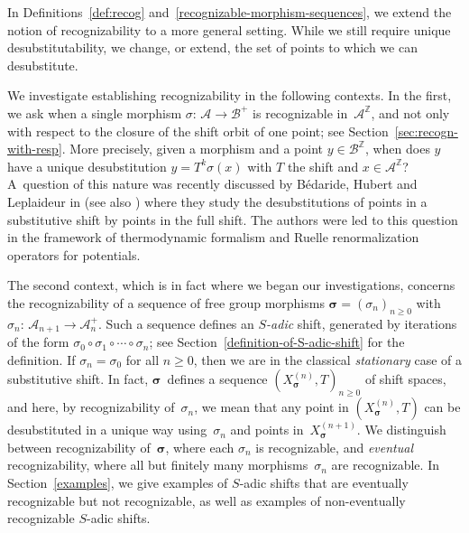 \documentclass{amsart}
\theoremstyle{definition}
\theoremstyle{remark}
\numberwithin{equation}{section}
\begin{document}
In Definitions~\ref{def:recog} and~\ref{recognizable-morphism-sequences},  we extend the notion of recognizability to a more general setting. While we still require unique desubstitutability, we change, or extend, the set of points to which we can desubstitute.
 
We investigate establishing recognizability in the following contexts.
In the first, we ask when a single morphism $\sigma:\, \mathcal{A} \to \mathcal{B}^+$ is recognizable in~$\mathcal{A}^\mathbb{Z}$, and not only with respect to the closure of the shift orbit of one point; see Section~\ref{sec:recogn-with-resp}. 
More precisely, given a morphism and a point $y\in\mathcal{B}^\mathbb{Z}$, when does $y$ have a unique desubstitution $y = T^k \sigma(x)$ with $T$ the shift and $x \in \mathcal{A}^\mathbb{Z}$? 
A~question of this nature was recently discussed by B\'{e}daride, Hubert and Leplaideur in \cite{BedHubLep:15} (see also \cite{Emme:16})  where they study the desubstitutions of  points in a  substitutive shift by points in the full shift.
The authors were led to this question in the framework of thermodynamic formalism and Ruelle renormalization operators for potentials.

The second context, which is in fact where we began our investigations, concerns the recognizability of a sequence of free group morphisms $\boldsymbol{\sigma} = (\sigma_n)_{n\geq 0}$ with $\sigma_n:\, \mathcal{A}_{n+1} \to \mathcal{A}_n^+$. 
Such a sequence defines an \emph{$S$-adic} shift, generated by iterations of the form $\sigma_0 \circ \sigma_1 \circ \cdots \circ \sigma_n$; see Section~\ref{definition-of-S-adic-shift} for the  definition. 
If $\sigma_n = \sigma_0$ for all $n\geq 0$, then we are in the classical \emph{stationary} case of a substitutive shift. 
In fact, $\boldsymbol{\sigma}$~defines a sequence $(X_{\boldsymbol{\sigma}}^{(n)},T)_{n\geq 0}$ of shift spaces, and here, by recognizability of~$\sigma_n$, we mean that any point in $(X_{\boldsymbol{\sigma}}^{(n)},T)$ can be  desubstituted in a  unique way using~$\sigma_n$ and points in~$X_{\boldsymbol{\sigma}}^{(n+1)}$. 
We distinguish between recognizability of~$\boldsymbol{\sigma}$, where each $\sigma_n$ is recognizable, and \emph{eventual} recognizability, where all but finitely many  morphisms~$\sigma_n$ are recognizable. 
In Section~\ref{examples}, we give examples of $S$-adic shifts that are eventually recognizable but not recognizable, as well as examples of non-eventually recognizable $S$-adic shifts.
\end{document}
